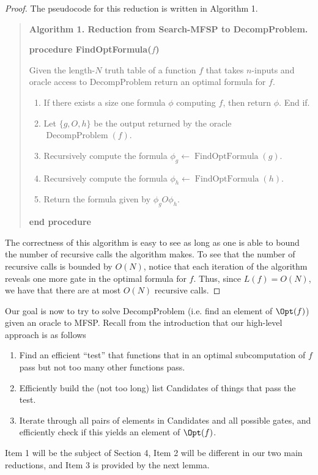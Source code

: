 \begin{proof}
The pseudocode for this reduction is written in Algorithm 1.
\begin{quote}\textbf{Algorithm 1. Reduction from Search-MFSP to DecompProblem.}\par
\textbf{procedure FindOptFormula($f$)}\par
Given the length-$N$ truth table of a function $f$ that takes $n$-inputs and oracle access to DecompProblem return an optimal formula for $f$.
\begin{enumerate}
\item If there exists a size one formula $\phi$ computing $f$, then return $\phi$. End if.
\item Let $\{g,O,h\}$ be the output returned by the oracle $\operatorname{DecompProblem}(f)$.
\item Recursively compute the formula $\phi_g\leftarrow\operatorname{FindOptFormula}(g)$.
\item Recursively compute the formula $\phi_h\leftarrow\operatorname{FindOptFormula}(h)$.
\item Return the formula given by $\phi_gO\phi_h$.
\end{enumerate}
\textbf{end procedure}
\end{quote}
The correctness of this algorithm is easy to see as long as one is able to bound the number of recursive calls the algorithm makes. To see that the number of recursive calls is bounded by $O(N)$, notice that each iteration of the algorithm reveals one more gate in the optimal formula for $f$. Thus, since $L(f)=O(N)$, we have that there are at most $O(N)$ recursive calls.
\end{proof}
Our goal is now to try to solve DecompProblem (i.e. find an element of $\Opt(f)$) given an oracle to MFSP. Recall from the introduction that our high-level approach is as follows
\begin{enumerate}
\item Find an efficient ``test'' that functions that in an optimal subcomputation of $f$ pass but not too many other functions pass.
\item Efficiently build the (not too long) list Candidates of things that pass the test.
\item Iterate through all pairs of elements in Candidates and all possible gates, and efficiently check if this yields an element of $\Opt(f)$.
\end{enumerate}
Item 1 will be the subject of Section 4, Item 2 will be different in our two main reductions, and Item 3 is provided by the next lemma.
